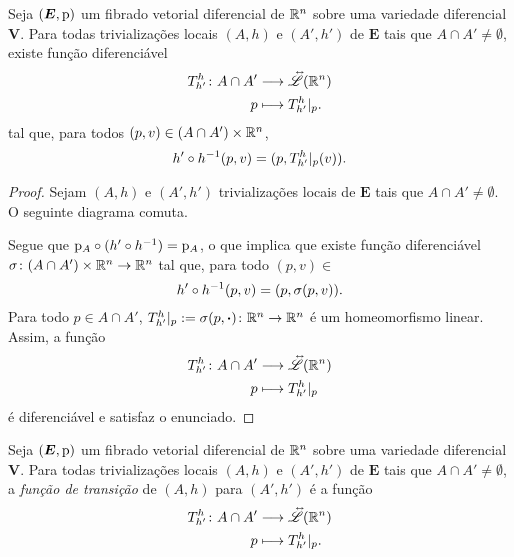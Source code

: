\begin{proposition}
Seja $(\bm E,\mathrm{p})$ um fibrado vetorial diferencial de $\mathbb{R}^n$ sobre uma variedade diferencial $\bm V$. Para todas trivializações locais $(A,h)$ e $(A',h')$ de $\bm E$ tais que $A \cap A' \neq \emptyset$, existe função diferenciável
	\begin{align*}
	{T^h_{h'}}\colon {A \cap A'} &\longrightarrow {\accentset{\leftrightarrow}{\mathscr{L}}(\mathbb{R}^n)} \\{p} &\longmapsto T^h_{h'}|_p.
	\end{align*}
tal que, para todos $(p,v) \in (A \cap A') \times \mathbb{R}^n$,
	\begin{equation*}
	h' \circ h^{-1}(p,v) = (p,T^h_{h'}|_p (v)).
	\end{equation*}
\end{proposition}
\begin{proof}
Sejam $(A,h)$ e $(A',h')$ trivializações locais de $\bm E$ tais que $A \cap A' \neq \emptyset$. O seguinte diagrama comuta.
\begin{figure}
\centering
{}
\end{figure}

Segue que $\mathrm{p}_A \circ (h' \circ h^{-1}) = \mathrm{p}_A$, o que implica que existe função diferenciável $\sigma\colon (A \cap A') \times \mathbb{R}^n \to \mathbb{R}^n$ tal que, para todo $(p,v) \in $
	\begin{equation*}
	h' \circ h^{-1}(p,v) = (p,\sigma(p,v)).
	\end{equation*}
Para todo $p \in A \cap A'$, $T^h_{h'}|_p := \sigma(p,\bm{\cdot})\colon \mathbb{R}^n \to \mathbb{R}^n$ é um homeomorfismo linear. Assim, a função
	\begin{align*}
	{T^h_{h'}}\colon {A \cap A'} &\longrightarrow {\accentset{\leftrightarrow}{\mathscr{L}}(\mathbb{R}^n)} \\{p} &\longmapsto T^h_{h'}|_p
	\end{align*}
é diferenciável e satisfaz o enunciado.
\end{proof}

\begin{definition}
Seja $(\bm E,\mathrm{p})$ um fibrado vetorial diferencial de $\mathbb{R}^n$ sobre uma variedade diferencial $\bm V$. Para todas trivializações locais $(A,h)$ e $(A',h')$ de $\bm E$ tais que $A \cap A' \neq \emptyset$, a \emph{função de transição} de $(A,h)$ para $(A',h')$ é a função
	\begin{align*}
	{T^h_{h'}}\colon {A \cap A'} &\longrightarrow {\accentset{\leftrightarrow}{\mathscr{L}}(\mathbb{R}^n)} \\{p} &\longmapsto T^h_{h'}|_p.
	\end{align*}
\end{definition}

